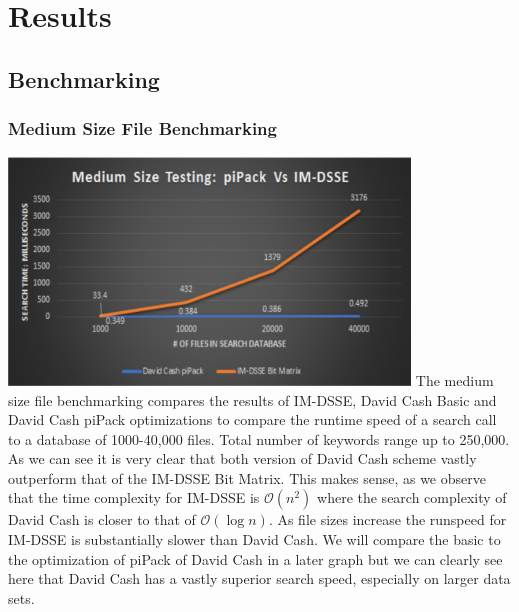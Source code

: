 
\chapter{Results}

\section{Benchmarking}

\subsection{Medium Size File Benchmarking}
\includegraphics[width=0.8\textwidth]{Charts/medium_size.eps}
The medium size file benchmarking compares the results of IM-DSSE, David Cash Basic and David Cash piPack optimizations to compare the runtime speed of a search call to a database of 1000-40,000 files. Total number of keywords range up to 250,000. As we can see it is very clear that both version of David Cash scheme vastly outperform that of the IM-DSSE Bit Matrix. This makes sense, as we observe that the time complexity for IM-DSSE is $\mathcal{O} (n^2)$ where the search complexity of David Cash is closer to that of $\mathcal{O} (\log n)$. As file sizes increase the runspeed for IM-DSSE is substantially slower than David Cash. We will compare the basic to the optimization of piPack of David Cash in a later graph but we can clearly see here that David Cash has a vastly superior search speed, especially on larger data sets.


